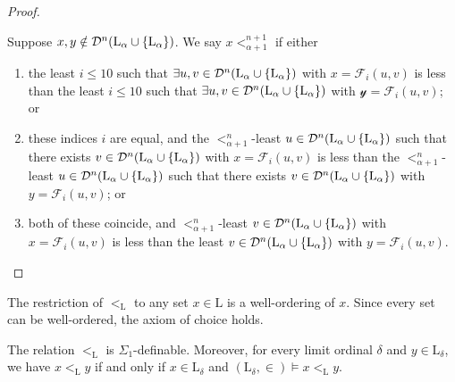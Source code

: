 \begin{proof}
\begin{enumerate}
        Suppose \( x, y \notin \mathcal D^n(\mathrm{L}_\alpha \cup \qty{\mathrm{L}_\alpha}) \).
        We say \( x <_{\alpha + 1}^{n+1} \) if either
        \begin{enumerate}
            \item the least \( i \leq 10 \) such that \( \exists u, v \in \mathcal D^n(\mathrm{L}_\alpha \cup \qty{\mathrm{L}_\alpha}) \) with \( x = \mathcal F_i(u, v) \) is less than the least \( i \leq 10 \) such that \( \exists u, v \in \mathcal D^n(\mathrm{L}_\alpha \cup \qty{\mathrm{L}_\alpha}) \) with \( \mathcal y = \mathcal F_i(u, v) \); or
            \item these indices \( i \) are equal, and the \( <_{\alpha + 1}^n \)-least \( u \in \mathcal D^n(\mathrm{L}_\alpha \cup \qty{\mathrm{L}_\alpha}) \) such that there exists \( v \in \mathcal D^n(\mathrm{L}_\alpha \cup \qty{\mathrm{L}_\alpha}) \) with \( x = \mathcal F_i(u, v) \) is less than the \( <_{\alpha + 1}^n \)-least \( u \in \mathcal D^n(\mathrm{L}_\alpha \cup \qty{\mathrm{L}_\alpha}) \) such that there exists \( v \in \mathcal D^n(\mathrm{L}_\alpha \cup \qty{\mathrm{L}_\alpha}) \) with \( y = \mathcal F_i(u, v) \); or
            \item both of these coincide, and \( <_{\alpha + 1}^n \)-least \( v \in \mathcal D^n(\mathrm{L}_\alpha \cup \qty{\mathrm{L}_\alpha}) \) with \( x = \mathcal F_i(u, v) \) is less than the least \( v \in \mathcal D^n(\mathrm{L}_\alpha \cup \qty{\mathrm{L}_\alpha}) \) with \( y = \mathcal F_i(u, v) \).
        \end{enumerate}
    \end{enumerate}
\end{proof}
The restriction of \( <_{\mathrm{L}} \) to any set \( x \in \mathrm{L} \) is a well-ordering of \( x \).
Since every set can be well-ordered, the axiom of choice holds.
\begin{lemma}
    The relation \( <_{\mathrm{L}} \) is \( \Sigma_1 \)-definable.
    Moreover, for every limit ordinal \( \delta \) and \( y \in \mathrm{L}_\delta \), we have \( x <_{\mathrm{L}} y \) if and only if \( x \in \mathrm{L}_\delta \) and \( (\mathrm{L}_\delta, \in) \vDash x <_{\mathrm{L}} y \).
\end{lemma}

